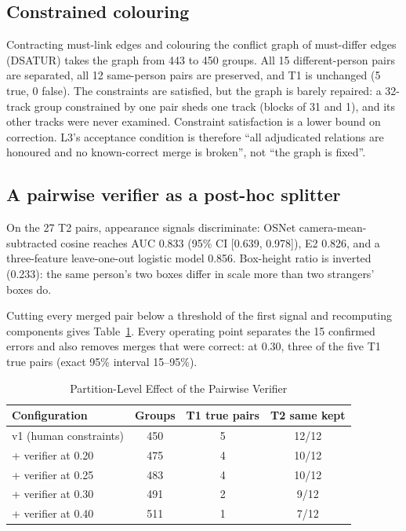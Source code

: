 \documentclass[journal]{IEEEtran}
\begin{document}
\subsection{Constrained colouring}
Contracting must-link edges and colouring the conflict graph of must-differ edges (DSATUR) takes the graph from 443 to 450 groups. All 15 different-person pairs are separated, all 12 same-person pairs are preserved, and T1 is unchanged (5 true, 0 false). The constraints are satisfied, but the graph is barely repaired: a 32-track group constrained by one pair sheds one track (blocks of 31 and 1), and its other tracks were never examined. Constraint satisfaction is a lower bound on correction. L3's acceptance condition is therefore ``all adjudicated relations are honoured and no known-correct merge is broken'', not ``the graph is fixed''.

\subsection{A pairwise verifier as a post-hoc splitter}
On the 27 T2 pairs, appearance signals discriminate: OSNet camera-mean-subtracted cosine reaches AUC 0.833 (95\% CI [0.639, 0.978]), E2 0.826, and a three-feature leave-one-out logistic model 0.856. Box-height ratio is inverted (0.233): the same person's two boxes differ in scale more than two strangers' boxes do.

Cutting every merged pair below a threshold of the first signal and recomputing components gives Table~\ref{tab:verifier}. Every operating point separates the 15 confirmed errors and also removes merges that were correct: at 0.30, three of the five T1 true pairs (exact 95\% interval 15--95\%).

\begin{table}[t]
\caption{Partition-Level Effect of the Pairwise Verifier}\label{tab:verifier}
\centering
\begin{tabular}{@{}lccc@{}}
\toprule
Configuration & Groups & T1 true pairs & T2 same kept\\
\midrule
v1 (human constraints) & 450 & 5 & 12/12\\
+ verifier at 0.20 & 475 & 4 & 10/12\\
+ verifier at 0.25 & 483 & 4 & 10/12\\
+ verifier at 0.30 & 491 & 2 & 9/12\\
+ verifier at 0.40 & 511 & 1 & 7/12\\
\bottomrule
\end{tabular}
\end{table}
\end{document}
